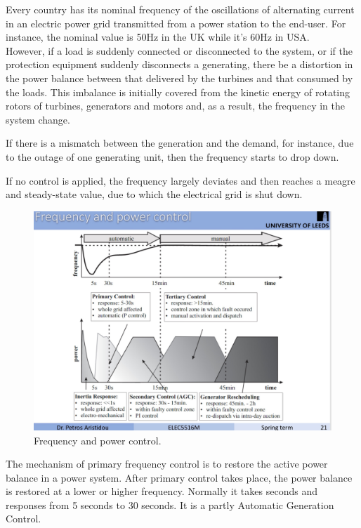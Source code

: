 Every country has its nominal frequency of the oscillations of alternating current in an electric power grid transmitted from a power station to the end-user. For instance, the nominal value is 50Hz in the UK while it’s 60Hz in USA.\\

However, if a load is suddenly connected or disconnected to the system, or if the protection equipment suddenly disconnects a generating, there be a distortion in the power balance between that delivered by the turbines and that consumed by the loads. This imbalance is initially covered from the kinetic energy of rotating rotors of turbines, generators and motors and, as a result, the frequency in the system change.

If there is a mismatch between the generation and the demand, for instance, due to the outage of one generating unit, then the frequency starts to drop down.  

If no control is applied, the frequency largely deviates and then reaches a meagre and steady-state value, due to which the electrical grid is shut down.\\

\begin{figure}[t]
\center
\includegraphics[scale=0.2]{figure/2_1_freq.jpeg}
\caption{Frequency and power control.}
\label{2_1_freq}
\end{figure}

The mechanism of primary frequency control is to restore the active power balance in a power system. After primary control takes place, the power balance is restored at a lower or higher frequency. Normally it takes seconds and responses from 5 seconds to 30 seconds. It is a partly Automatic Generation Control.\\


